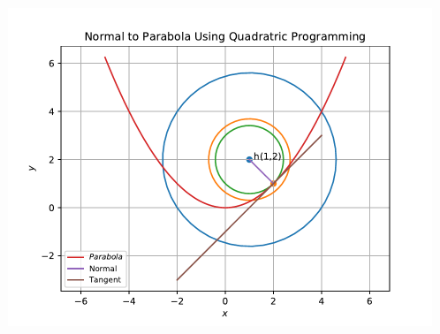 \documentclass[12pt]{article}
\begin{document}
\begin{enumerate}
\begin{figure}[!h]
	\begin{center}
		\includegraphics[width=\columnwidth]{figs/problem23.pdf}
	\end{center}
\caption{}
\label{fig:Fig1}
\end{figure}
\end{enumerate}
\end{document}
